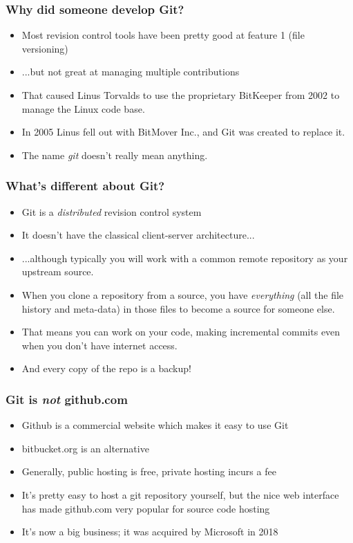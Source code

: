 \documentclass{beamer}
\begin{document}
\begin{frame}
  \frametitle{Why did someone develop Git?}
  \begin{itemize}
    \pause \item Most revision control tools have been pretty good at
    feature 1 (file versioning)
    \pause \item ...but not great at managing multiple contributions
    \pause \item That caused Linus Torvalds to use the proprietary
    BitKeeper from 2002 to manage the Linux code base.
    \pause \item In 2005 Linus fell out with BitMover Inc., and Git was
    created to replace it.
    \pause \item The name \emph{git} doesn't really mean anything.
  \end{itemize}
\end{frame}

\begin{frame}
  \frametitle{What's different about Git?}
  \begin{itemize}
  \item Git is a \emph{distributed} revision control system
  \pause \item It doesn't have the classical client-server architecture...
  \pause \item ...although typically you will work with a common
  \alert{remote} repository as your \alert{upstream} source.
  \pause \item When you \alert{clone} a repository from a source, you have
    \emph{everything} (all the file history and meta-data) in those
    files to become a source for someone else.
  \pause \item That means you can work on your code, making incremental
  \alert{commits} even when you don't have internet access.
  \pause \item And every copy of the \alert{repo} is a backup!
  \end{itemize}
\end{frame}

\begin{frame}
  \frametitle{Git is \emph{not} github.com}
  \begin{itemize}
  \item Github is a commercial website which makes it easy to use Git
  \item bitbucket.org is an alternative
  \pause \item Generally, public hosting is free, private hosting
  incurs a fee
  \pause \item It's pretty easy to host a git repository yourself, but
  the nice web interface has made github.com very
  popular for source code hosting
  \pause \item It's now a big business; it was acquired by Microsoft in 2018
  \end{itemize}
\end{frame}
\end{document}
